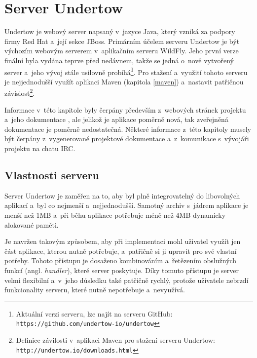     \section{Server Undertow} \label{undertow}
        Undertow je webový server napsaný v~jazyce Java, 
        který vzniká za podpory firmy Red Hat a~její sekce JBoss.
        Primárním účelem serveru Undertow je být výchozím webovým serverem v~aplikačním serveru WildFly.
        Jeho první verze finální byla vydána teprve před nedávnem, takže se jedná
o~nově vytvořený server a~jeho vývoj stále usilovně 
        probíhá\footnote{Aktuální verzi serveru, lze najít na serveru GitHub: 
        \texttt{https://github.com/undertow-io/undertow}}. Pro stažení a~využití tohoto serveru
        je nejjednodušší využít aplikaci Maven (kapitola \ref{maven}) a~nastavit patřičnou 
        závislost\footnote{Definice závilosti v~aplikaci Maven pro stažení serveru Undertow: 
        \texttt{http://undertow.io/downloads.html} }.

        Informace v~této kapitole byly čerpány především z~webových stránek projektu \cite{undertowWeb}
a~jeho dokumentace \cite{undertowDocs},
        ale jelikož je aplikace poměrně nová, tak zveřejněná dokumentace je poměrně nedostatečná. 
        Některé informace z~této kapitoly musely být čerpány
        z~vygenerované projektové dokumentace a~z~komunikace s~vývojáři projektu
        na chatu IRC.

        \subsection{Vlastnosti serveru}
            Server Undertow je zaměřen na to, aby byl plně integrovatelný do libovolných aplikací
            a~byl co nejmenší a~nejjednodušší. Samotný
            archiv s~jádrem aplikace je menší než 1MB a~při běhu aplikace potřebuje
            méně než 4MB dynamicky alokované paměti. 

            Je navržen takovým způsobem, aby při implementaci mohl uživatel využít
            jen část aplikace, kterou nutně potřebuje, a~patřičně si ji upravit
            pro své vlastní potřeby.
            Tohoto přístupu je dosaženo kombinováním a~řetězením
            obslužných funkcí (angl. \emph{handler}), které server poskytuje.
            Díky tomuto přístupu je server velmi flexibilní a~v~jeho důsledku
            také patřičně rychlý, protože uživatele nebrzdí funkcionality
            serveru, které nutně nepotřebuje a~nevyužívá.
            
